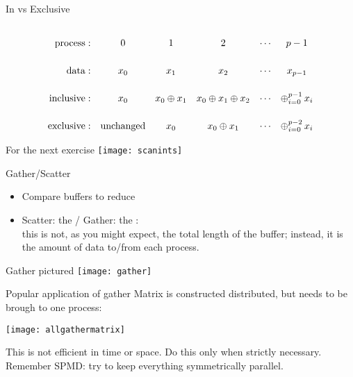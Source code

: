 \begin{numberedframe}{In vs Exclusive}
  \def\strut{\vrule height 25pt width 0pt\relax}
\[
\begin{array}{rccccc}
  \mathrm{process:}\strut
      &0&1&2&\cdots&p-1\\
  \mathrm{data:}\strut
      &x_0&x_1&x_2&\cdots&x_{p-1}\\
  \mathrm{inclusive:}\strut
      &x_0&x_0\oplus x_1&x_0\oplus x_1\oplus x_2&\cdots&\mathop\oplus_{i=0}^{p-1} x_i\\
  \mathrm{exclusive:}\strut
      &\mathrm{unchanged}&x_0&x_0\oplus x_1&\cdots&\mathop\oplus_{i=0}^{p-2} x_i\\
\end{array}
\]
\end{numberedframe}


\begin{numberedframe}{For the next exercise}
  \label{fig:scanints}
  \texttt{[image: scanints]}
\end{numberedframe}

\begin{exerciseframe}[scangather]
  
\end{exerciseframe}



\begin{numberedframe}{Gather/Scatter}
\begin{itemize}
\item Compare buffers to reduce
\item Scatter: the  / Gather: the :\\
this is not, as you might expect, the total length of the
buffer; instead, it is the amount of data to/from each process.
\end{itemize}
\end{numberedframe}

\begin{numberedframe}{Gather pictured}
  \texttt{[image: gather]}
\end{numberedframe}

\begin{numberedframe}{Popular application of gather}
  Matrix is constructed distributed, but needs to be brough to one
  process:
  
  \texttt{[image: allgathermatrix]}

  This is not efficient in time or space. Do this
  only when strictly necessary. Remember SPMD: try to keep everything
  symmetrically parallel. 
\end{numberedframe}


